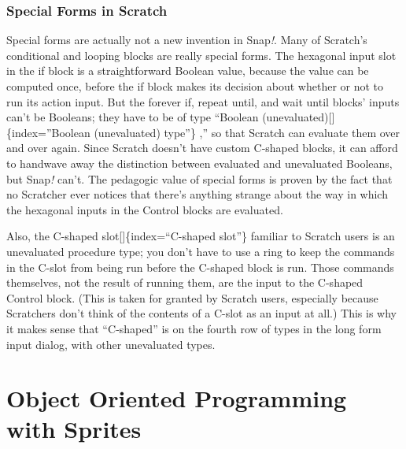 \documentclass[
  letterpaper,
]{book}
\begin{document}
\subsection{Special Forms in Scratch}\label{special-forms-in-scratch}

Special forms are actually not a new invention in Snap\emph{!}. Many of
Scratch's conditional and looping blocks are really special forms. The
hexagonal input slot in the if block is a straightforward Boolean value,
because the value can be computed once, before the if block makes its
decision about whether or not to run its action input. But the forever
if, repeat until, and wait until blocks' inputs can't be Booleans; they
have to be of type ``Boolean (unevaluated){[}{]}\{index=''Boolean
(unevaluated) type''\} ,'' so that Scratch can evaluate them over and
over again. Since Scratch doesn't have custom C‑shaped blocks, it can
afford to handwave away the distinction between evaluated and
unevaluated Booleans, but Snap\emph{!} can't. The pedagogic value of
special forms is proven by the fact that no Scratcher ever notices that
there's anything strange about the way in which the hexagonal inputs in
the Control blocks are evaluated.

Also, the C-shaped slot{[}{]}\{index=``C-shaped slot''\} familiar to
Scratch users is an unevaluated procedure type; you don't have to use a
ring to keep the commands in the C-slot from being run before the
C-shaped block is run. Those commands themselves, not the result of
running them, are the input to the C-shaped Control block. (This is
taken for granted by Scratch users, especially because Scratchers don't
think of the contents of a C-slot as an input at all.) This is why it
makes sense that ``C‑shaped'' is on the fourth row of types in the long
form input dialog, with other unevaluated types.


\chapter{Object Oriented Programming with
Sprites}\label{object-oriented-programming-with-sprites}
\end{document}
